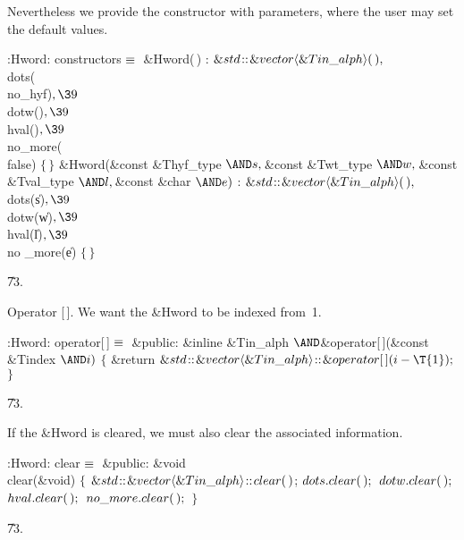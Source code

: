 Nevertheless we provide the constructor with parameters, where the user
may set the default values.

\Y\B\4:Hword: constructors\X${}\equiv{}$\6
\&{Hword}(\,)\1\1\2\2\6
: ${}\&{std}\kern.1em{::}\kern.1em\&{vector}\langle\&{Tin\_alph}\rangle(\,),{}$\6
\\{dots}(\\{no\_hyf})${},\39{}$ \\{dotw}()${},\39{}$ \\{hval}()${},%
\39{}$ \\{no\_more}(\\{false}) ${}\{\,\}{}$\7
\&{Hword}(\&{const} \&{Thyf\_type} ${}{\AND}\|s,\39{}$\&{const} \&{Twt\_type}
${}{\AND}\|w,\39{}$\&{const} \&{Tval\_type} ${}{\AND}\|l,\39{}$\&{const} %
\&{char} ${}{\AND}\|e){}$\1\1\2\2\6
: ${}\&{std}\kern.1em{::}\kern.1em\&{vector}\langle\&{Tin\_alph}\rangle(\,),{}$\6
\\{dots}(\|s)${},\39{}$ \\{dotw}(\|w)${},\39{}$ \\{hval}(\|l)${},\39{}$ \\{no%
\_more}(\|e) ${}\{\,\}{}$\par
\U73.\fi

Operator [\,]. We want the \&{Hword} to be indexed from~1.

\Y\B\4:Hword: operator[\,]\X${}\equiv{}$\6
\4\&{public}:\6
\&{inline} \&{Tin\_alph} ${}{\AND}{}$\&{operator}[\,](\&{const} \&{Tindex} ${}{%
\AND}\|i){}$\1\1\2\2\6
${}\{{}$\1\6
\&{return} ${}\&{std}\DC\&{vector}\langle\&{Tin\_alph}\rangle\DC\&{operator}[%
\,](\|i-\T{1});{}$\6
\4${}\}{}$\2\par
\U73.\fi

If the \&{Hword} is cleared, we must also clear the associated
information.

\Y\B\4:Hword: clear\X${}\equiv{}$\6
\4\&{public}:\6
\&{void} \\{clear}(\&{void})\1\1\2\2\6
${}\{{}$\1\6
${}\&{std}\kern.1em{::}\kern.1em\&{vector}\langle\&{Tin\_alph}\rangle\kern.1em{::}\kern.1em\\{clear}(\,){}$;\6
${}\\{dots}.\\{clear}(\,);{}$\6
${}\\{dotw}.\\{clear}(\,);{}$\6
${}\\{hval}.\\{clear}(\,);{}$\6
${}\\{no\_more}.\\{clear}(\,);{}$\6
\4${}\}{}$\2\par
\U73.\fi

